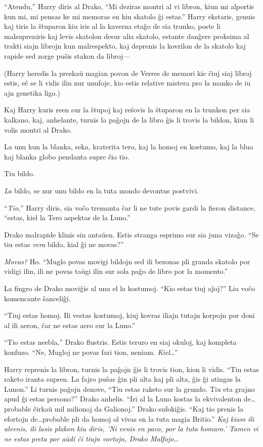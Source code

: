 ``Atendu,'' Harry diris al Drako, ``Mi deziras montri al vi libron,
kiun mi alportis kun mi, mi pensas ke mi memoras en kiu skatolo ĝi
estas.'' Harry ekstaris, genuis kaj tiris la ŝtuparon kiu iris al
la kaverna etaĝo de sia trunko, poste li malsupreniris kaj levis
skatolon desur alia skatolo, estante danĝere proksima al trakti
siajn librojn kun malrespekto, kaj deprenis la kovrilon de la
skatolo kaj rapide sed zorge puŝis stakon da libroj—

(Harry heredis la preskaŭ magian povon de Verres de memori kie ĉiuj
siaj libroj estis, eĉ se li vidis ilin nur unufoje, kio estis relative
mistera pro la manko de iu ajn genetika ligo.)

Kaj Harry kuris reen sur la ŝtupoj kaj reŝovis la ŝtuparon en la
trunkon per sia kalkano, kaj, anhelante, turnis la paĝojn de la libro
ĝis li trovis la bildon, kiun li volis montri al Drako.

La unu kun la blanka, seka, kraterita tero, kaj la homoj en kostumo,
kaj la blua kaj blanka globo pendanta supre ĉio tio.

Tiu bildo.

\emph{La} bildo, se nur unu bildo en la tuta mondo devontus postvivi.

``\emph{Tio},'' Harry diris, sia voĉo tremanta ĉar li ne tute povis
gardi la fieron distance, ``estas, kiel la Tero aspektas de la Luno.''

Drako malrapide klinis sin antaŭen. Estis stranga esprimo sur sia juna
vizaĝo. ``Se tiu estas \emph{vera} bildo, kial ĝi ne movas?''

\emph{Movas?} Ho. ``Muglo povas movigi bildojn sed ili bezonas pli
granda skatolo por vidigi ilin, ili ne povas taŭgi ilin sur sola paĝo
de libro por la momento.''

La fingro de Drako moviĝis al unu el la kostumoj. ``Kio estas tiuj
aĵoj?'' Lia voĉo komencante ŝanceliĝi.

``Tiuj estas homoj. Ili vestas kostumoj, kiuj kovras iliajn tutajn
korpojn por doni al ili aeron, ĉar ne estas aero sur la Luno.''

``Tio estas neebla,'' Drako flustris. Estis teruro en siaj okuloj, kaj
kompleta konfuzo. ``Ne, Mugloj ne povas fari tion,
neniam. \emph{Kiel}\ldots''

Harry reprenis la libron, turnis la paĝojn ĝis li trovis tion, kion li
vidis. ``Tiu estas raketo iranta supren. La fajro puŝas ĝin pli alta
kaj pli alta, ĝis ĝi atingas la Lunon.'' Li turnis paĝojn denove,
``Tiu estas raketo sur la grundo. Tiu eta grajno apud ĝi estas
persono?''  Drako anhelis. ``Iri al la Luno kostas la ekvivalenton
de\ldots probable ĉirkaŭ mil milionoj da Galionoj.'' Drako
sufokiĝis. ``Kaj tio prenis la efortojn de\ldots probable pli da homoj
ol vivas en la tuta magia Britio.'' \emph{Kaj kiam ili alvenis, ili
  lasis plakon kiu diris, 'Ni venis en paco, por la tuta homaro.'
  Tamen vi ne estas preta por aŭdi ĉi tiujn vortojn, Drako
  Malfojo\ldots}

